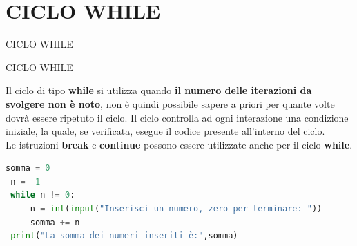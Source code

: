 \documentclass[aspectratio=1610]{beamer}
\begin{document}
\section{CICLO WHILE}

\begin{frame}[fragile]{CICLO WHILE}
    \begin{alertblock}{CICLO WHILE}
        \begin{minipage}{0.98\linewidth}
            \justifying
            Il ciclo di tipo \textbf{while} si utilizza quando \textbf{il numero delle iterazioni da svolgere non è 
            noto}, non è quindi possibile sapere a priori per quante volte dovrà essere ripetuto il ciclo. 
            Il ciclo controlla ad ogni interazione una condizione iniziale, la quale, se verificata, esegue il 
            codice presente all'interno del ciclo.\\
            Le istruzioni \textbf{break} e \textbf{continue} possono essere utilizzate anche per il ciclo \textbf{while}. 
            \pause
\begin{lstlisting}[language=Python]
 somma = 0
 n = -1
 while n != 0:
     n = int(input("Inserisci un numero, zero per terminare: "))
     somma += n
 print("La somma dei numeri inseriti è:",somma)
\end{lstlisting}
        \end{minipage}
    \end{alertblock}
\end{frame}
\end{document}
